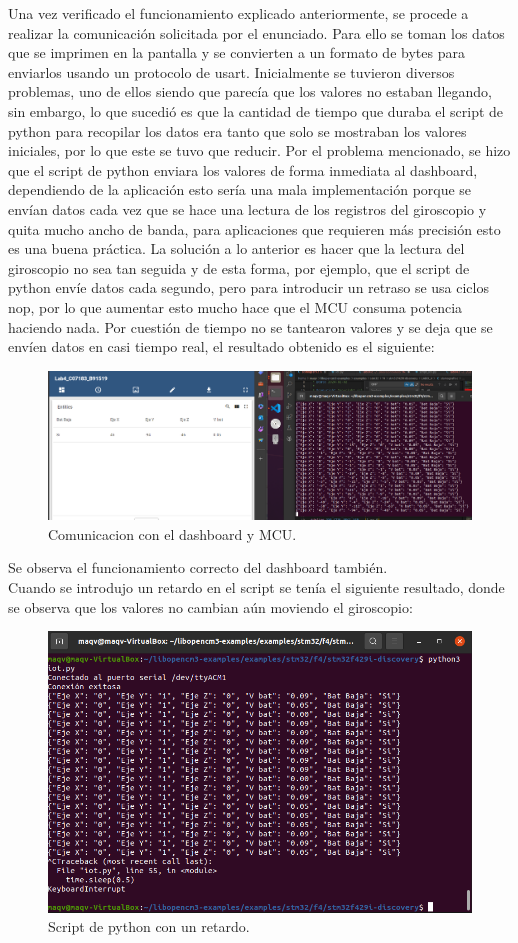 Una vez verificado el funcionamiento explicado anteriormente, se procede a realizar la comunicación solicitada por el enunciado. Para ello se toman los datos que se imprimen en la pantalla y se convierten a un formato de bytes para enviarlos usando un protocolo de usart.
Inicialmente se tuvieron diversos problemas, uno de ellos siendo que parecía que los valores no estaban llegando, sin embargo, lo que sucedió es que la cantidad de tiempo que duraba el script de python para recopilar los datos era tanto que solo se mostraban los valores iniciales, por lo que este se tuvo que reducir. Por el problema mencionado, se hizo que el script de python enviara los valores de forma inmediata al dashboard, dependiendo de la aplicación esto sería una mala implementación porque se envían datos cada vez que se hace una lectura de los registros del giroscopio y quita mucho ancho de banda, para aplicaciones que requieren más precisión esto es una buena práctica. La solución a lo anterior es hacer que la lectura del giroscopio no sea tan seguida y de esta forma, por ejemplo, que el script de python envíe datos cada segundo, pero para introducir un retraso se usa ciclos nop, por lo que aumentar esto mucho hace que el MCU consuma potencia haciendo nada.
Por cuestión de tiempo no se tantearon valores y se deja que se envíen datos en casi tiempo real, el resultado obtenido es el siguiente:
\begin{figure}[H]
    \centering
    \includegraphics[width=.7\linewidth]{Imagenes/k4.png}
    \caption{Comunicacion con el dashboard y MCU.}
\end{figure}
Se observa el funcionamiento correcto del dashboard también.\\

Cuando se introdujo un retardo en el script se tenía el siguiente resultado, donde se observa que los valores no cambian aún moviendo el giroscopio:
\begin{figure}[H]
    \centering
    \includegraphics[width=.7\linewidth]{Imagenes/k5.png}
    \caption{Script de python con un retardo.}
\end{figure}

